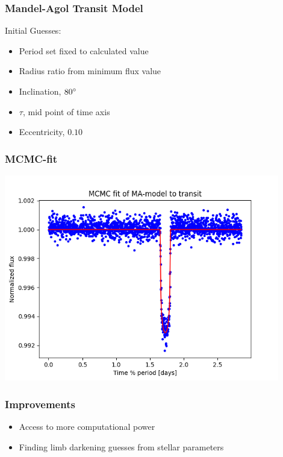 \documentclass[notes]{beamer}
\begin{document}
\begin{frame}
	\frametitle{Mandel-Agol Transit Model}
	Initial Guesses:
	\begin{itemize}
		\item Period set fixed to calculated value
		\item Radius ratio from minimum flux value
		\item Inclination, $ 80 \degree$
		\item $ \tau $, mid point of time axis
		\item Eccentricity, $ 0.10 $
	\end{itemize}
\end{frame}


\begin{frame}
\frametitle{MCMC-fit}
\centering
\includegraphics[width=0.9\textwidth]{../figures/MCMC_fit0.png}
\end{frame}

\begin{frame}
	\frametitle{Improvements}
	\begin{itemize}
		\item Access to more computational power
		\item Finding limb darkening guesses from stellar parameters
		
		
	\end{itemize}
\end{frame}
\end{document}
